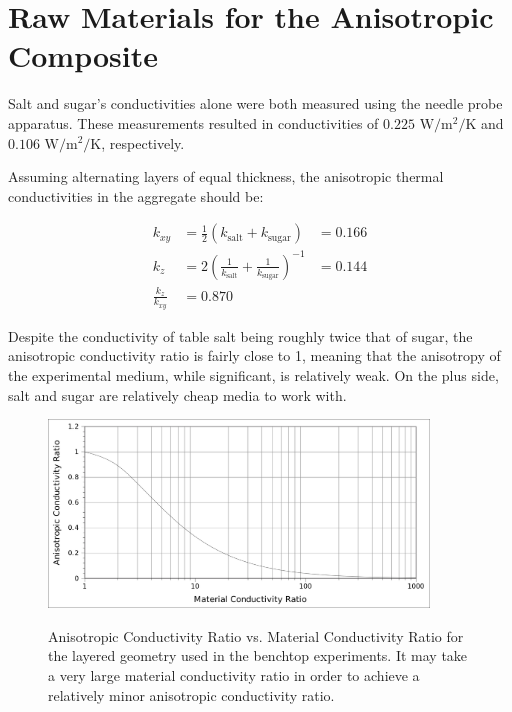 \section{Raw Materials for the Anisotropic Composite}

Salt and sugar's conductivities alone were both measured using the needle probe
apparatus. These measurements resulted in conductivities of
\(0.225\) \(\textrm{W}/\textrm{m}^2/\textrm{K}\) and 
\(0.106\) \(\textrm{W}/\textrm{m}^2/\textrm{K}\), respectively.


Assuming alternating layers of equal thickness, the anisotropic thermal
conductivities in the aggregate should be:

\begin{align}
k_{xy} &= \frac12 \left( k_{\textrm{salt}} + k_{\textrm{sugar}} \right) &= \boxed{0.166}\\
k_z &= 2 \left( \frac1{k_{\textrm{salt}}} + \frac1{k_{\textrm{sugar}}} \right)^{-1} &= \boxed{0.144}\\
\frac{k_z}{k_{xy}} &= \boxed{0.870}
\end{align}

Despite the conductivity of table salt being roughly twice that of sugar, the
anisotropic conductivity ratio is fairly close to 1, meaning that the anisotropy
of the experimental medium, while significant, is relatively weak. On the plus
side, salt and sugar are relatively cheap media to work with.

\begin{figure}[h]
\centering
\includegraphics[width=0.9\textwidth]{fig/anisovmaterial_ratios.png}
\label{fig:anisovmatl_rats}
\caption{Anisotropic Conductivity Ratio vs. Material Conductivity Ratio for the
layered geometry used in the benchtop experiments. It may take a very large
material conductivity ratio in order to achieve a relatively minor anisotropic
conductivity ratio.}
\end{figure}

